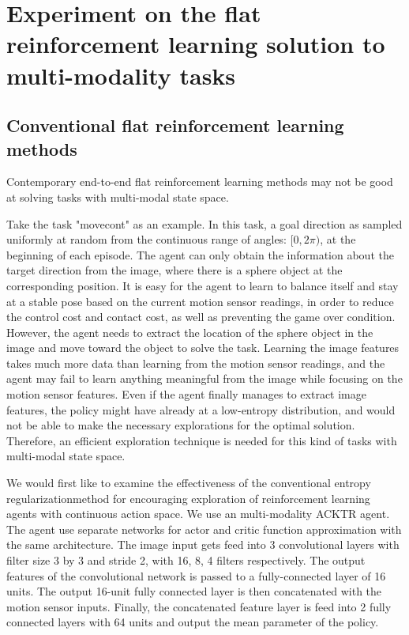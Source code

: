 
\section{Experiment on the flat reinforcement learning solution to multi-modality tasks}
\subsection{Conventional flat reinforcement learning methods}\label{sec_multi_modal_flat}
Contemporary end-to-end flat reinforcement learning methods may not be good at solving tasks with multi-modal state space. 

Take the task "movecont" as an example. In this task, a goal direction as sampled uniformly at random from the continuous range of angles: $[0,2\pi)$, at the beginning of each episode. The agent can only obtain the information about the target direction from the image, where there is a sphere object at the corresponding position. It is easy for the agent to learn to balance itself and stay at a stable pose based on the current motion sensor readings, in order to reduce the control cost and contact cost, as well as preventing the game over condition. However, the agent needs to extract the location of the sphere object in the image and move toward the object to solve the task. Learning the image features takes much more data than learning from the motion sensor readings, and the agent may fail to learn anything meaningful from the image while focusing on the motion sensor features. Even if the agent finally manages to extract image features, the policy might have already at a low-entropy distribution, and would not be able to make the necessary explorations for the optimal solution. Therefore, an efficient exploration technique is needed for this kind of tasks with multi-modal state space.

We would first like to examine the effectiveness of the conventional entropy regularizationmethod for encouraging exploration of reinforcement learning agents with continuous action space. We use an multi-modality ACKTR agent. The agent use separate networks for actor and critic function approximation with the same architecture. The image input gets feed into 3 convolutional layers with filter size 3 by 3 and stride 2, with 16, 8, 4 filters respectively. The output features of the convolutional network is passed to a fully-connected layer of 16 units. The output 16-unit fully connected layer is then concatenated with the motion sensor inputs. Finally, the concatenated feature layer is feed into 2 fully connected layers with 64 units and output the mean parameter of the policy. 

